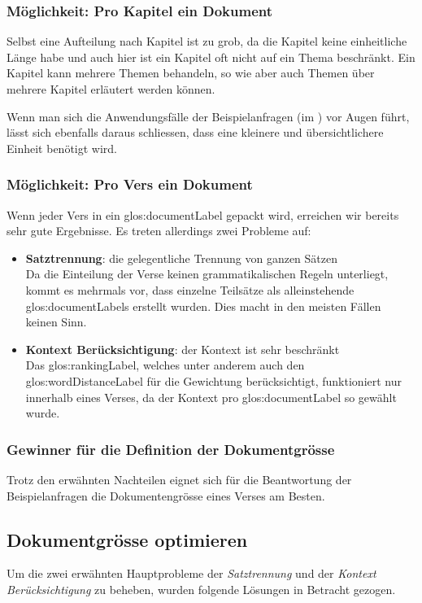 \subsubsection{Möglichkeit: Pro Kapitel ein Dokument}
Selbst eine Aufteilung nach Kapitel ist zu grob, da die Kapitel keine einheitliche Länge habe und auch hier ist ein Kapitel oft nicht auf ein Thema beschränkt.
Ein Kapitel kann mehrere Themen behandeln, so wie aber auch Themen über mehrere Kapitel erläutert werden können.

Wenn man sich die Anwendungsfälle der Beispielanfragen (im ) vor Augen führt, lässt sich ebenfalls daraus schliessen, dass eine kleinere und übersichtlichere Einheit benötigt wird.

\subsubsection{Möglichkeit: Pro Vers ein Dokument}
Wenn jeder Vers in ein \gls{glos:documentLabel} gepackt wird, erreichen wir bereits sehr gute Ergebnisse.
Es treten allerdings zwei Probleme auf:
\begin{itemize}[noitemsep]
	\item \textbf{Satztrennung}: die gelegentliche Trennung von ganzen Sätzen\\
	Da die Einteilung der Verse keinen grammatikalischen Regeln unterliegt, kommt es mehrmals vor, dass einzelne Teilsätze als alleinstehende \glspl{glos:documentLabel} erstellt wurden. Dies macht in den meisten Fällen keinen Sinn.
	\item \textbf{Kontext Berücksichtigung}: der Kontext ist sehr beschränkt\\
	Das \gls{glos:rankingLabel}, welches unter anderem auch den \gls{glos:wordDistanceLabel} für die Gewichtung berücksichtigt, funktioniert nur innerhalb eines Verses, da der Kontext pro \gls{glos:documentLabel} so gewählt wurde.
\end{itemize}

\subsubsection{Gewinner für die Definition der Dokumentgrösse}
Trotz den erwähnten Nachteilen eignet sich für die Beantwortung der Beispielanfragen die Dokumentengrösse eines Verses am Besten.


\subsection{Dokumentgrösse optimieren}
\label{sec:documentOptimazing}
Um die zwei erwähnten Hauptprobleme der \textit{Satztrennung} und der \textit{Kontext Berücksichtigung} zu beheben, wurden folgende Lösungen in Betracht gezogen.

